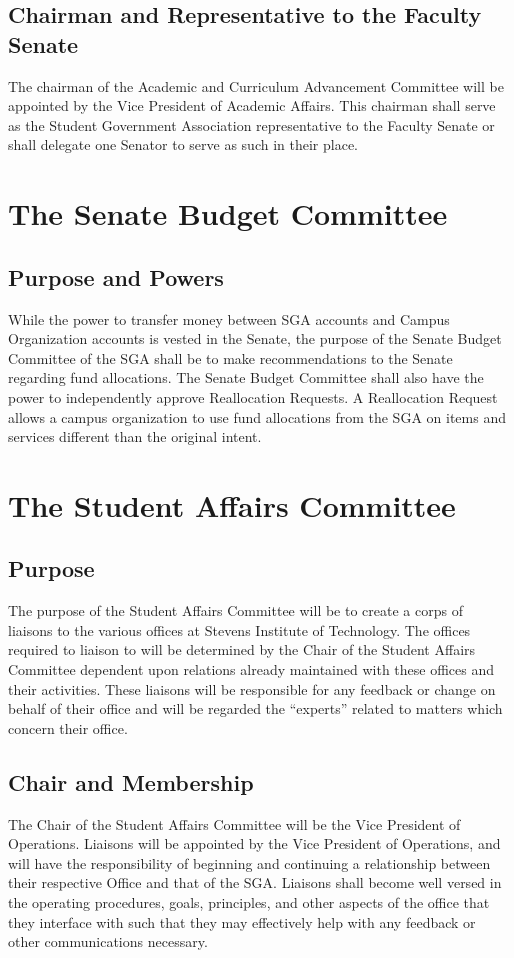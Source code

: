 \documentclass[12pt]{scrreprt}
\begin{document}
\subsection{Chairman and Representative to the Faculty Senate}
The chairman of the Academic and Curriculum Advancement Committee will be
appointed by the Vice President of Academic Affairs. This chairman shall serve as the
Student Government Association representative to the Faculty Senate or shall delegate
one Senator to serve as such in their place.

\section{The Senate Budget Committee}

\subsection{Purpose and Powers}
While the power to transfer money between SGA
accounts and Campus Organization accounts is vested in the Senate, the purpose of the Senate Budget Committee of the SGA shall be to make recommendations to the Senate regarding fund allocations. The Senate Budget Committee shall also have the power to independently approve Reallocation Requests. A Reallocation Request allows a campus organization to use fund
allocations from the SGA on items and services different than the original intent.

\section{The Student Affairs Committee}

\subsection{Purpose}
The purpose of the Student Affairs Committee will be to create a corps of liaisons to the
various offices at Stevens Institute of Technology. The offices required to liaison to will be
determined by the Chair of the Student Affairs Committee dependent upon relations already
maintained with these offices and their activities. These liaisons will be responsible for any
feedback or change on behalf of their office and will be regarded the “experts” related to
matters which concern their office.

\subsection{Chair and Membership}
The Chair of the Student Affairs Committee will be the Vice President of Operations.
Liaisons will be appointed by the Vice President of Operations, and will have the responsibility of beginning and continuing a relationship between their respective Office and that of the SGA. Liaisons shall become well versed in the operating procedures, goals, principles, and other aspects of the office that they interface with such that they may effectively help with any feedback or other communications necessary.
\end{document}
